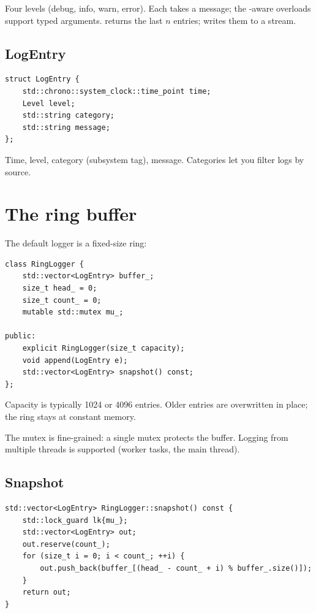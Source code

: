 Four levels (debug, info, warn, error). Each takes a message;
the -aware overloads support typed
arguments.  returns the last $n$ entries;
 writes them to a stream.

\subsection*{LogEntry}

\begin{lstlisting}
struct LogEntry {
    std::chrono::system_clock::time_point time;
    Level level;
    std::string category;
    std::string message;
};
\end{lstlisting}

Time, level, category (subsystem tag), message. Categories let
you filter logs by source.

\section{The ring buffer}

The default logger is a fixed-size ring:

\begin{lstlisting}
class RingLogger {
    std::vector<LogEntry> buffer_;
    size_t head_ = 0;
    size_t count_ = 0;
    mutable std::mutex mu_;

public:
    explicit RingLogger(size_t capacity);
    void append(LogEntry e);
    std::vector<LogEntry> snapshot() const;
};
\end{lstlisting}

Capacity is typically 1024 or 4096 entries. Older entries are
overwritten in place; the ring stays at constant memory.

The mutex is fine-grained: a single mutex protects the buffer.
Logging from multiple threads is supported (worker tasks, the
main thread).

\subsection*{Snapshot}

\begin{lstlisting}
std::vector<LogEntry> RingLogger::snapshot() const {
    std::lock_guard lk{mu_};
    std::vector<LogEntry> out;
    out.reserve(count_);
    for (size_t i = 0; i < count_; ++i) {
        out.push_back(buffer_[(head_ - count_ + i) % buffer_.size()]);
    }
    return out;
}
\end{lstlisting}

